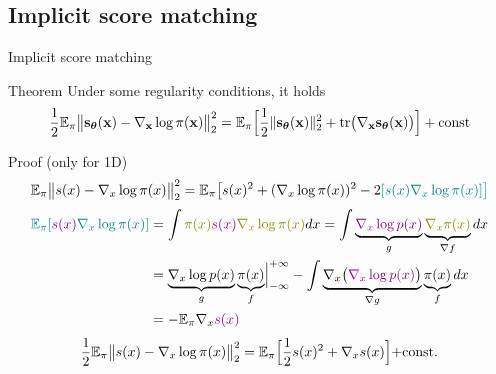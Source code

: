 \documentclass{beamer}
\begin{document}
\subsection{Implicit score matching}
\begin{frame}{Implicit score matching}
	\begin{block}{Theorem}
		Under some regularity conditions, it holds
		\vspace{-0.2cm}
		\[
		\frac{1}{2} \mathbb{E}_{\pi}\bigl\| \mathbf{s}_{\boldsymbol{\theta}}(\mathbf{x}) - \nabla_{\mathbf{x}} \log \pi(\mathbf{x}) \bigr\|^2_2 = \mathbb{E}_{\pi}\Bigr[ \frac{1}{2}\| \mathbf{s}_{\boldsymbol{\theta}}(\mathbf{x}) \|_2^2 + \text{tr}\bigl(\nabla_{\mathbf{x}} \mathbf{s}_{\boldsymbol{\theta}}(\mathbf{x})\bigr) \Bigr] + \text{const}
		\]
		\vspace{-0.6cm}
	\end{block}
	\begin{block}{Proof (only for 1D)}
		\vspace{-0.6cm}
		{\small
			\begin{multline*}
				\mathbb{E}_{\pi}\bigl\| s(x) - \nabla_x \log \pi(x) \bigr\|^2_2 = \mathbb{E}_{\pi} \bigl[ s(x)^2 + (\nabla_x \log \pi(x))^2 - 2{\color{teal}[s(x) \nabla_x \log \pi(x) ] \bigr] }
			\end{multline*}
			\vspace{-0.8cm}
			\begin{align*}
				{\color{teal}\bbE_{\pi} [{\color{violet}s(x) } \nabla_x \log \pi(x) ] } &= \int {\color{olive}\pi(x) {\color{violet}s(x)}  \nabla_x \log \pi(x)} d x 
				= \int \underbrace{\color{violet}\nabla_x \log p(x) }_{g} \underbrace{\color{olive}\nabla_x \pi(x) }_{\nabla f} dx \\
				& = \Bigl. \underbrace{\nabla_x \log p(x)}_{g} \underbrace{\pi(x)}_{f} \Bigr|_{-\infty}^{+\infty} - \int \underbrace{\nabla_x \bigl( {\color{violet}\nabla_x \log p(x)} \bigr)}_{\nabla g} \underbrace{\pi(x)}_{f} dx \\
				& = - \bbE_{\pi} \nabla_x {\color{violet}s(x)}
			\end{align*}
			\vspace{-0.4cm}
			\[
			\frac{1}{2} \mathbb{E}_{\pi}\bigl\| s(x) - \nabla_x \log \pi(x) \bigr\|^2_2 = \mathbb{E}_{\pi} \Bigr[\frac{1}{2} s(x)^2 + \nabla_x s(x) \Bigl]+ \text{const}.
			\]
		}
	\end{block}
\end{frame}
\end{document}
